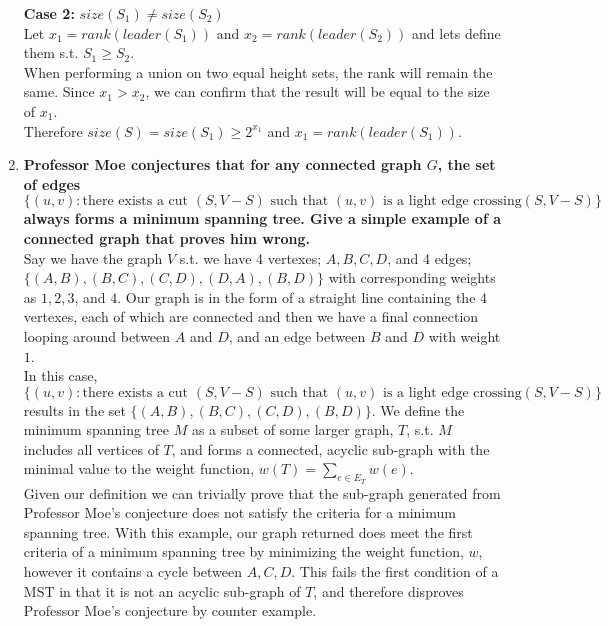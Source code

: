\documentclass{article}
\begin{document}
\begin{enumerate}
\textbf{Case 2: } $size(S_1) \neq size(S_2)$ \\
Let $x_1 = rank(leader(S_1))$ and $x_2 = rank(leader(S_2))$ and lets define them s.t. $S_1 \geq S_2$. \\
\newline 
When performing a union on two equal height sets, the rank will remain the same. Since $x_1 > x_2$, we can confirm that the result will be equal to the size of $x_1$. \\
\newline 
Therefore $size(S) = size(S_1) \geq 2^{x_1}$ and $x_1 = rank(leader(S_1))$.







\newpage
\item \textbf{ Professor Moe conjectures that for any connected graph $G$, the set of edges } \\
$\{ (u,v) : \text{there exists a cut } (S, V-S) \text{ such that } (u,v) \text{ is a light edge crossing} (S, V-S) \}$ \\
\textbf{always forms a minimum spanning tree. Give a simple example of a connected graph that proves him wrong.} \\

Say we have the graph $V$ s.t. we have 4 vertexes; $A, B, C, D$, and 4 edges; $\{ (A,B), (B,C), (C,D), (D,A), (B,D) \}$ with corresponding weights as $1, 2, 3$, and $4$. Our graph is in the form of a straight line containing the 4 vertexes, each of which are connected and then we have a final connection looping around between $A$ and $D$, and an edge between $B$ and $D$ with weight $1$. \\
\newline 
In this case, $\{ (u,v) : \text{there exists a cut } (S, V-S) \text{ such that } (u,v) \text{ is a light edge crossing} (S, V-S) \}$ results in the set $\{ (A,B), (B,C), (C,D), (B,D) \}$. We define the minimum spanning tree $M$ as a subset of some larger graph, $T$, s.t. $M$ includes all vertices of $T$, and forms a connected, acyclic sub-graph with the minimal value to the weight function, $w(T) = \sum_{e \in E_T} w(e)$. \\
\newline 
Given our definition we can trivially prove that the sub-graph generated from Professor Moe's conjecture does not satisfy the criteria for a minimum spanning tree. With this example, our graph returned does meet the first criteria of a minimum spanning tree by minimizing the weight function, $w$, however it contains a cycle between $A,C,D$. This fails the first condition of a MST in that it is not an acyclic sub-graph of $T$, and therefore disproves Professor Moe's conjecture by counter example.  \\
\newline








\end{enumerate}
\end{document}
